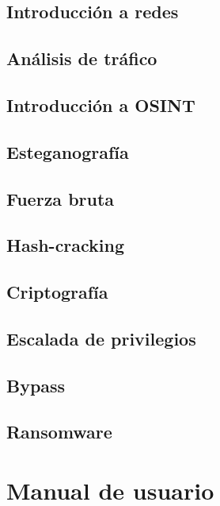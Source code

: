    \section{Introducción a redes}

    \section{Análisis de tráfico}

    \section{Introducción a OSINT}

    \section{Esteganografía}

    \section{Fuerza bruta}

    \section{Hash-cracking}

    \section{Criptografía}

    \section{Escalada de privilegios}

    \section{Bypass}

    \section{Ransomware}

            \cleardoublepage



\chapter{Manual de usuario}

